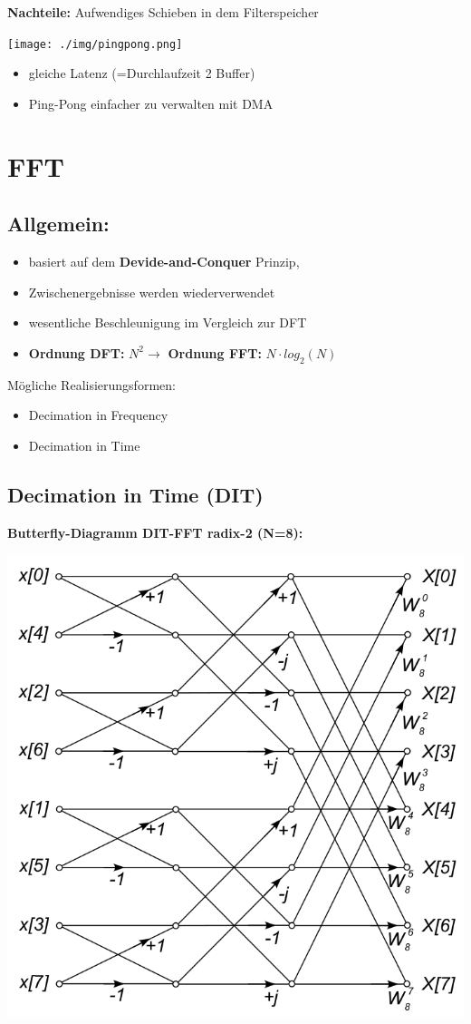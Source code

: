 \documentclass[10pt,a4paper]{article}
\begin{document}
\textbf{Nachteile:} Aufwendiges Schieben in dem Filterspeicher

  \begin{center}
      \texttt{[image: ./img/pingpong.png]}
  \end{center}

  \begin{itemize}
    \item gleiche Latenz (=Durchlaufzeit 2 Buffer)
    \item Ping-Pong einfacher zu verwalten mit DMA
  \end{itemize}

\section{FFT}
\subsection{Allgemein: }
\begin{itemize}
  \item basiert auf dem \textbf{Devide-and-Conquer} Prinzip,
  \item Zwischenergebnisse werden wiederverwendet
  \item wesentliche Beschleunigung im Vergleich zur DFT
  \item \textbf{Ordnung DFT:} $N^2 \rightarrow$ \textbf{Ordnung FFT:} $N\cdot log_{2}(N)$
\end{itemize}
Mögliche Realisierungsformen:
\begin{itemize}
    \item Decimation in Frequency
    \item Decimation in Time 
\end{itemize}

\subsection{Decimation in Time (DIT)}
\textbf{Butterfly-Diagramm DIT-FFT radix-2 (N=8):}
\begin{center}
  \includegraphics[width=.3\textwidth]{./img/Decimation_in_Time.png}
\end{center} 
\end{document}
